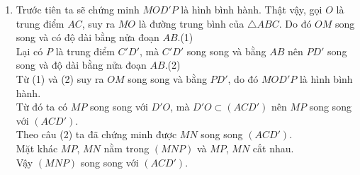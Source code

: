 \begin{bt}
{\begin{enumerate}
			\item Trước tiên ta sẽ chứng minh $MOD'P$ là hình bình hành.
			Thật vậy, gọi $O$ là trung điểm $AC$, suy ra $MO$ là đường trung bình của $\triangle ABC$. Do đó $OM$ song song và có độ dài bằng nửa đoạn $AB$.\hfill (1)\\
			Lại có $P$ là trung điểm $C'D'$, mà $C'D'$ song song và bằng $AB$ nên $PD'$ song song và độ dài bằng nửa đoạn $AB$.\hfill (2)\\
			Từ (1) và (2) suy ra $OM$ song song và bằng $PD'$, do đó $MOD'P$ là hình bình hành.\\
			Từ đó ta có $MP$ song song với $D'O$, mà $D'O\subset (ACD')$ nên $MP$ song song với $(ACD')$.\\
			Theo câu (2) ta đã chứng minh được $MN$ song song $(ACD')$.\\
			Mặt khác $MP$, $MN$ nằm trong $(MNP)$ và $MP$, $MN$ cắt nhau.\\
			Vậy $(MNP)$ song song với $(ACD')$.
		\end{enumerate}
	}
\end{bt}

